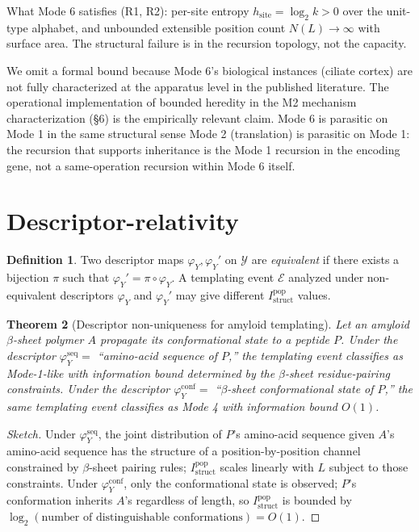 \documentclass[11pt]{article}
\theoremstyle{plain}
\newtheorem{theorem}{Theorem}
\theoremstyle{definition}
\newtheorem{definition}[theorem]{Definition}
\newcommand{\Istructpop}{I_{\mathrm{struct}}^{\mathrm{pop}}}
\newcommand{\descY}{\varphi_Y}
\begin{document}
What Mode 6 satisfies (R1, R2): per-site entropy $h_{\mathrm{site}} = \log_2 k > 0$ over the unit-type alphabet, and unbounded extensible position count $N(L) \to \infty$ with surface area. The structural failure is in the recursion topology, not the capacity.

We omit a formal bound because Mode 6's biological instances (ciliate cortex) are not fully characterized at the apparatus level in the published literature. The operational implementation of bounded heredity in the M2 mechanism characterization (\S6) is the empirically relevant claim. Mode 6 is parasitic on Mode 1 in the same structural sense Mode 2 (translation) is parasitic on Mode 1: the recursion that supports inheritance is the Mode 1 recursion in the encoding gene, not a same-operation recursion within Mode 6 itself.


\section{Descriptor-relativity}
\label{sec:descriptor}

\begin{definition}
Two descriptor maps $\descY, \descY'$ on $\mathcal{Y}$ are \emph{equivalent} if there exists a bijection $\pi$ such that $\descY' = \pi \circ \descY$. A templating event $\mathcal{E}$ analyzed under non-equivalent descriptors $\descY$ and $\descY'$ may give different $\Istructpop$ values.
\end{definition}

\begin{theorem}[Descriptor non-uniqueness for amyloid templating]
\label{thm:amyloid}
Let an amyloid $\beta$-sheet polymer $A$ propagate its conformational state to a peptide $P$. Under the descriptor $\descY^{\mathrm{seq}} = $ ``amino-acid sequence of $P$,'' the templating event classifies as Mode-1-like with information bound determined by the $\beta$-sheet residue-pairing constraints. Under the descriptor $\descY^{\mathrm{conf}} = $ ``$\beta$-sheet conformational state of $P$,'' the same templating event classifies as Mode 4 with information bound $O(1)$.
\end{theorem}

\begin{proof}[Sketch]
Under $\descY^{\mathrm{seq}}$, the joint distribution of $P$'s amino-acid sequence given $A$'s amino-acid sequence has the structure of a position-by-position channel constrained by $\beta$-sheet pairing rules; $\Istructpop$ scales linearly with $L$ subject to those constraints. Under $\descY^{\mathrm{conf}}$, only the conformational state is observed; $P$'s conformation inherits $A$'s regardless of length, so $\Istructpop$ is bounded by $\log_2(\text{number of distinguishable conformations}) = O(1)$.
\end{proof}
\end{document}
